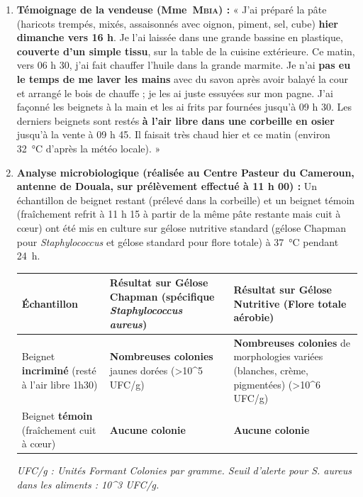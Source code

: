 \documentclass[11pt]{article}
\begin{document}
\begin{enumerate}
    \item \textbf{Témoignage de la vendeuse (Mme~\textsc{Mbia}) :} « J'ai préparé la pâte (haricots trempés, mixés, assaisonnés avec oignon, piment, sel, cube) \textbf{hier dimanche vers 16 h}. Je l'ai laissée dans une grande bassine en plastique, \textbf{couverte d'un simple tissu}, sur la table de la cuisine extérieure. Ce matin, vers 06 h 30, j'ai fait chauffer l'huile dans la grande marmite. Je n'ai \textbf{pas eu le temps de me laver les mains} avec du savon après avoir balayé la cour et arrangé le bois de chauffe ; je les ai juste essuyées sur mon pagne. J'ai façonné les beignets à la main et les ai frits par fournées jusqu'à 09 h 30. Les derniers beignets sont restés \textbf{à l'air libre dans une corbeille en osier} jusqu'à la vente à 09 h 45. Il faisait très chaud hier et ce matin (environ \SI{32}{\celsius} d'après la météo locale). »
    
    \item \textbf{Analyse microbiologique (réalisée au Centre Pasteur du Cameroun, antenne de Douala, sur prélèvement effectué à 11 h 00) :}
    Un échantillon de beignet restant (prélevé dans la corbeille) et un beignet témoin (fraîchement refrit à 11 h 15 à partir de la même pâte restante mais cuit à cœur) ont été mis en culture sur gélose nutritive standard (gélose Chapman pour \textit{Staphylococcus} et gélose standard pour flore totale) à \SI{37}{\celsius} pendant \SI{24}{\hour}.
    
    \begin{center}
    \begin{tabularx}{\linewidth}{|l|X|X|}\hline
    \rowcolor{popblueL}
    \textbf{Échantillon} & \textbf{Résultat sur Gélose Chapman (spécifique \textit{Staphylococcus aureus})} & \textbf{Résultat sur Gélose Nutritive (Flore totale aérobie)} \\ \hline
    Beignet \textbf{incriminé} (resté à l'air libre 1h30) & \textbf{Nombreuses colonies} jaunes dorées (\textgreater \num{10^5} UFC/g) & \textbf{Nombreuses colonies} de morphologies variées (blanches, crème, pigmentées) (\textgreater \num{10^6} UFC/g) \\ \hline
    Beignet \textbf{témoin} (fraîchement cuit à cœur) & \textbf{Aucune colonie} & \textbf{Aucune colonie} \\ \hline
    \end{tabularx}
    \end{center}
    \textit{UFC/g : Unités Formant Colonies par gramme. Seuil d'alerte pour \textit{S. aureus} dans les aliments : \num{10^3} UFC/g.}
    

\end{enumerate}
\end{document}
